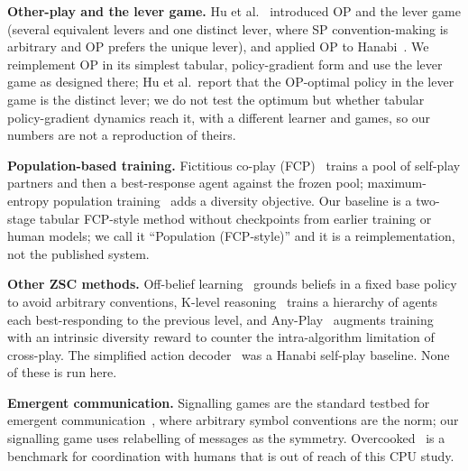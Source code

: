 \textbf{Other-play and the lever game.} Hu et al.~\cite{hu2020other} introduced OP and the lever game (several equivalent levers and one distinct lever, where SP convention-making is arbitrary and OP prefers the unique lever), and applied OP to Hanabi~\cite{bard2019hanabi}. We reimplement OP in its simplest tabular, policy-gradient form and use the lever game as designed there; Hu et al.\ report that the OP-optimal policy in the lever game is the distinct lever; we do not test the optimum but whether tabular policy-gradient dynamics reach it, with a different learner and games, so our numbers are not a reproduction of theirs.

\textbf{Population-based training.} Fictitious co-play (FCP)~\cite{strouse2021collaborating} trains a pool of self-play partners and then a best-response agent against the frozen pool; maximum-entropy population training~\cite{zhao2021maximum} adds a diversity objective. Our baseline is a two-stage tabular FCP-style method without checkpoints from earlier training or human models; we call it ``Population (FCP-style)'' and it is a reimplementation, not the published system.

\textbf{Other ZSC methods.} Off-belief learning~\cite{hu2021off} grounds beliefs in a fixed base policy to avoid arbitrary conventions, K-level reasoning~\cite{cui2022k} trains a hierarchy of agents each best-responding to the previous level, and Any-Play~\cite{lucas2022any} augments training with an intrinsic diversity reward to counter the intra-algorithm limitation of cross-play. The simplified action decoder~\cite{hu2019simplified} was a Hanabi self-play baseline. None of these is run here.

\textbf{Emergent communication.} Signalling games are the standard testbed for emergent communication~\cite{lazaridou2016multi}, where arbitrary symbol conventions are the norm; our signalling game uses relabelling of messages as the symmetry. Overcooked~\cite{carroll2019utility} is a benchmark for coordination with humans that is out of reach of this CPU study.
